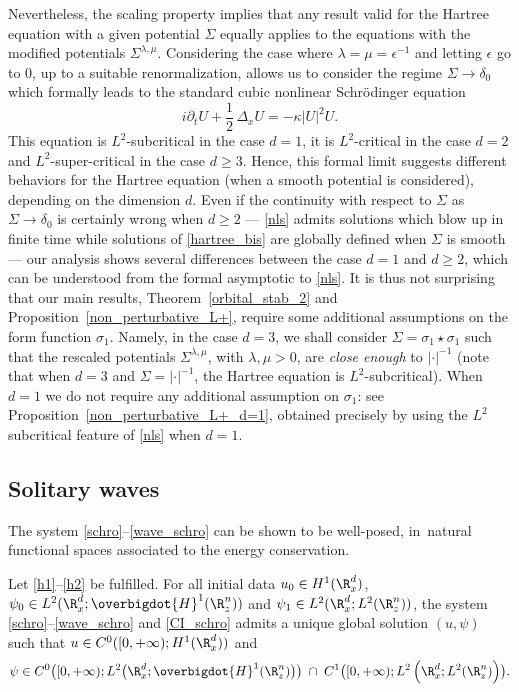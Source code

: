 Nevertheless, the scaling property implies that any result valid for the Hartree equation with a given potential $\Sigma$ equally applies
to the equations with the modified potentials $\Sigma^{\lambda,\mu}$. Considering the case where $\lambda=\mu=\epsilon^{-1}$ and letting
$\epsilon$ go to $ 0$, up to a suitable renormalization,
allows us to consider the regime $\Sigma\to\delta_{0}$ which formally leads to the standard cubic nonlinear Schrödinger equation
\begin{equation}\label{nls}
i\partial_{t} U+\frac{1}{2}\,\Delta_{x}U=-\kappa|U|^{2}U.
\end{equation}
This equation is $L^{2}$-subcritical in the case $d=1$, it is $L^{2}$-critical in the case $d=2$ and $L^{2}$-super-critical in the case $d\geq 3$. Hence, this formal limit suggests different behaviors for the Hartree equation (when a smooth potential is considered), depending on the dimension $d$.
Even if the continuity with respect to $\Sigma$ as $\Sigma\to\delta_{0}$ is certainly wrong when $d\geq 2$ --- \eqref{nls} admits solutions which blow up in finite time while solutions of \eqref{hartree_bis} are globally defined when $\Sigma$ is smooth --- our analysis shows several differences between the case $d=1$ and $d\geq 2$, which can be understood from the formal asymptotic to \eqref{nls}. It is thus not surprising that our main results, Theorem~\ref{orbital_stab_2} and Proposition~\ref{non_perturbative_L+}, require some additional assumptions on the form function $\sigma_{1}$. Namely, in the case $d=3$, we shall
consider $\Sigma=\sigma_{1}\star\sigma_{1}$ such that
the rescaled potentials $\Sigma^{\lambda,\mu}$, with $\lambda,\mu>0$, are \emph{close enough} to $|\cdot|^{-1}$ (note that when $d=3$ and $\Sigma=|\cdot|^{-1}$, the Hartree equation is $L^{2}$-subcritical). When $d=1$ we do not require any additional assumption on $\sigma_{1}$: see Proposition~\ref{non_perturbative_L+_d=1},
obtained precisely by using the $L^2$ subcritical feature of \eqref{nls} when $d=1$.

\subsection{Solitary waves}

The system \eqref{schro}--\eqref{wave_schro} can be shown to be well-posed,
in~natural functional spaces associated to the energy conservation.

\begin{theo}\label{TC}
Let \eqref{h1}--\eqref{h2} be fulfilled. For all initial data $u_{0}\in H^{1}(\R_{x}^{d})$, $\psi_{0}\in\nobreak L^{2}(\R_{x}^{d};\overbigdot{H}^{1}(\R_{z}^{n}))$ and $\psi_{1}\in L^{2}(\R_{x}^{d};L^{2}(\R_{z}^{n}))$, the system \eqref{schro}--\eqref{wave_schro} and \eqref{CI_schro} admits a unique global solution $(u,\psi)$ such that $u\in C^{0}([0,+\infty);H^{1}(\R_{x}^{d}))$ and
\[
\psi\in C^{0}\bigl([0,+\infty);L^{2}\bigl(\R_{x}^{d};\overbigdot{H}^{1}(\R_{z}^{n})\bigr)\bigr)\;\cap\;C^{1}\bigl([0,+\infty);L^{2}\left(\R_{x}^{d};L^{2}(\R_{z}^{n})\right)\bigr).
\]
\end{theo}

